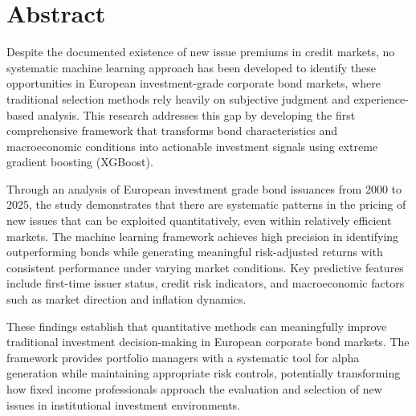 \chapter*{Abstract}

Despite the documented existence of new issue premiums in credit markets, no systematic machine learning approach has been developed to identify these opportunities in European investment-grade corporate bond markets, where traditional selection methods rely heavily on subjective judgment and experience-based analysis. This research addresses this gap by developing the first comprehensive framework that transforms bond characteristics and macroeconomic conditions into actionable investment signals using extreme gradient boosting (XGBoost).

Through an analysis of European investment grade bond issuances from 2000 to 2025, the study demonstrates that there are systematic patterns in the pricing of new issues that can be exploited quantitatively, even within relatively efficient markets. The machine learning framework achieves high precision in identifying outperforming bonds while generating meaningful risk-adjusted returns with consistent performance under varying market conditions. Key predictive features include first-time issuer status, credit risk indicators, and macroeconomic factors such as market direction and inflation dynamics.

These findings establish that quantitative methods can meaningfully improve traditional investment decision-making in European corporate bond markets. The framework provides portfolio managers with a systematic tool for alpha generation while maintaining appropriate risk controls, potentially transforming how fixed income professionals approach the evaluation and selection of new issues in institutional investment environments.